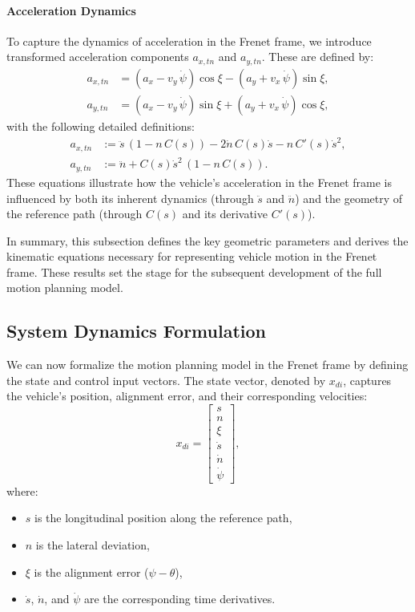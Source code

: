 \paragraph{Acceleration Dynamics}\label{par:acceleration_dynamics}
To capture the dynamics of acceleration in the Frenet frame, we introduce transformed acceleration components \(a_{x,tn}\) and \(a_{y,tn}\).
These are defined by:
\begin{align}
	a_{x,tn} & = (a_x - v_y\,\dot{\psi})\cos{\xi} - (a_y + v_x\,\dot{\psi})\sin{\xi}, \label{eq:second_derivative_long} \\
	a_{y,tn} & = (a_x - v_y\,\dot{\psi})\sin{\xi} + (a_y + v_x\,\dot{\psi})\cos{\xi}, \label{eq:second_derivative_lat}
\end{align}
with the following detailed definitions:
\begin{align}
	a_{x,tn} & := \ddot{s}\,(1 - n\,C(s)) - 2\dot{n}\,C(s)\dot{s} - n\,C'(s)\dot{s}^2, \label{def:axtn} \\
	a_{y,tn} & := \ddot{n} + C(s)\dot{s}^2\,(1 - n\,C(s)). \label{def:aytn}
\end{align}
These equations illustrate how the vehicle's acceleration in the Frenet frame is influenced by both its inherent dynamics (through \(\ddot{s}\) and
\(\ddot{n}\)) and the geometry of the reference path (through \(C(s)\) and its derivative \(C'(s)\)).

In summary, this subsection defines the key geometric parameters and derives the kinematic equations necessary for representing vehicle motion in the
Frenet frame.
These results set the stage for the subsequent development of the full motion planning model.

\subsection{System Dynamics Formulation}

We can now formalize the motion planning model in the Frenet frame by defining the state and control input vectors.
The state vector, denoted by \(x_{di}\), captures the vehicle's position, alignment error, and their corresponding velocities:
\begin{equation}
	x_{di} = \begin{bmatrix}
		s       \\
		n       \\
		\xi     \\
		\dot{s} \\
		\dot{n} \\
		\dot{\psi}
	\end{bmatrix},
\end{equation}
where:
\begin{itemize}
	\item \(s\) is the longitudinal position along the reference path,
	\item \(n\) is the lateral deviation,
	\item \(\xi\) is the alignment error (\(\psi - \theta\)),
	\item \(\dot{s}\), \(\dot{n}\), and \(\dot{\psi}\) are the corresponding time derivatives.
\end{itemize}

